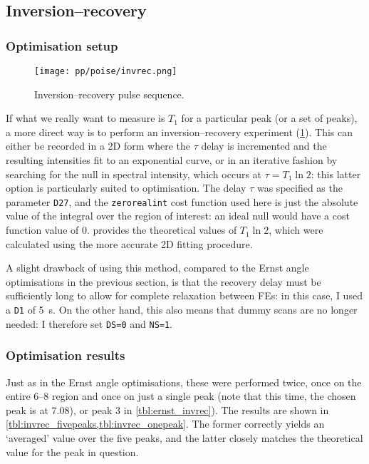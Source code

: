 \subsection{Inversion--recovery}
\label{subsec:poise__invrec}


\subsubsection{Optimisation setup}

\begin{figure}[htb]
    \centering
    \texttt{[image: pp/poise/invrec.png]}%
    \caption[Inversion--recovery pulse sequence]{Inversion--recovery pulse sequence.}
    \label{fig:poise_invrec}
\end{figure}

If what we really want to measure is $T_1$ for a particular peak (or a set of peaks), a more direct way is to perform an inversion--recovery experiment (\cref{fig:poise_invrec}).
This can either be recorded in a 2D form where the $\tau$ delay is incremented and the resulting intensities fit to an exponential curve, or in an iterative fashion by searching for the null in spectral intensity, which occurs at $\tau = T_1\ln 2$: this latter option is particularly suited to optimisation.
The delay $\tau$ was specified as the parameter \texttt{D27}, and the \texttt{zerorealint} cost function used here is just the absolute value of the integral over the region of interest: an ideal null would have a cost function value of 0.
 provides the theoretical values of $T_1 \ln 2$, which were calculated using the more accurate 2D fitting procedure.

A slight drawback of using this method, compared to the Ernst angle optimisations in the previous section, is that the recovery delay must be sufficiently long to allow for complete relaxation between FEs: in this case, I used a \texttt{D1} of \qty{5}{\s}.
On the other hand, this also means that dummy scans are no longer needed: I therefore set \texttt{DS=0} and \texttt{NS=1}.


\subsubsection{Optimisation results}

Just as in the Ernst angle optimisations, these were performed twice, once on the entire 6--\qty{8}{\ppm} region and once on just a single peak (note that this time, the chosen peak is at \qty{7.08}{\ppm}), or peak 3 in \cref{tbl:ernst_invrec}).
The results are shown in \cref{tbl:invrec_fivepeaks,tbl:invrec_onepeak}.
The former correctly yields an `averaged' value over the five peaks, and the latter closely matches the theoretical value for the peak in question.

